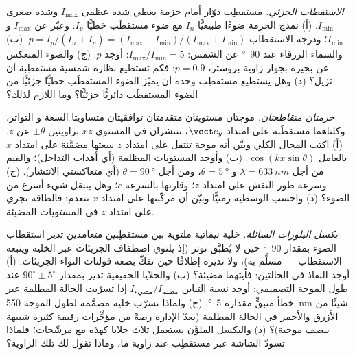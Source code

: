 \begin{exercise}[$\star\star$]\label{exo:b2:plane-waves-polarization:9}
\emph{الاستقطاب الجزئي.} مستقطِب دوّار أمام حزمة
يعطي شدة عظمى $I_{\max}$ وشدة صغرى $I_{\min}$. (أ) نمذج
الحزمة ضوءًا طبيعيًّا $I_n$ مع ضوء مستقطَب خطيًّا $I_p$: وعبّر عن
$I_{\max}$ و $I_{\min}$؛ ودرجة الاستقطاب $p = I_p/(I_n + I_p) =
(I_{\max} - I_{\min})/(I_{\max} + I_{\min})$. (ب) والسماء الزرقاء عند \qty{90}{\degree} عن
الشمس: $I_{\max}/I_{\min} = 5$: أوجد $p$. (ج) والضوء المنعكس عن بحيرة بجوار
زاوية بروستر، $p = 0.9$: فكم تستطيع نظارة شمسية مستقطِبة أن تزيل؟
(د) وهل يستطيع مستقطِب وحده أن يميّز الضوء المستقطَب خطيًّا جزئيًّا
من الضوء المستقطَب دائريًّا جزئيًّا؟ وما اللازم لذلك؟
\end{exercise}

\begin{exercise}[$\star\star\star$]\label{exo:b2:plane-waves-polarization:10}
\emph{حزمتان متقاطعتان.} موجتان مستويتان متقدمتان توافقيتان متساويتا السعة و
التواتر، وكلتاهما مستقطَبة على امتداد $\vect e_y$، تنتشران في المستوي $xz$
بزاويتين $\pm\theta$ عن $z$. (أ) اكتب المجال الكلي وبيّن أنه
موجة تنتقل على امتداد $z$ سعتها مضمَّنة على امتداد $x$ بالعامل
$\cos(kx\sin\theta)$. (ب) وأوجد  المستويات المظلمة (أي أهداب
التداخل)؛ والقيم من أجل $\lambda = \qty{633}{nm}$ و $\theta = \qty{5}{\degree}$، ومن أجل
$\theta = \qty{90}{\degree}$ (أي متعاكستي الانتشار). (ج) وسرعة طور
النقش على امتداد $z$؛ وقارنها بالسرعة $c$؛ وهل ينتقل شيء أسرع من
الضوء؟ (د) واحسب  الوسطية زمنيًّا وبيّن أن
مركّبتها على امتداد $x$ تنعدم: فالطاقة تجري على امتداد $z$ في المستويات
المضيئة.
\end{exercise}

\begin{exercise}[$\star\star\star$]\label{exo:b2:plane-waves-polarization:11}
\emph{بكسل البلورات السائلة.} خلية نيماتية ملتوية بين مستقطِبين
متعامدين تدير استقطاب الضوء بمقدار \qty{90}{\degree}
حين لا يُطبَّق توتر (إذ يلتوي اصطفاف الجزيئات عبر
الخلية ويتبعه الاستقطاب --- مسلَّم به)، ولا تديره إطلاقًا
حين تفكّ بضعة فولتات التواء الجزيئات. (أ) أوجد النفاذ في الحالتين: فأيتهما
مضيئة؟ (ب) والخلايا الحقيقية تدير بمقدار $90^\circ \pm 5^\circ$ عند طول الموجة
التصميمي: أوجد نسبة التباين $I_{\text{مضيء}}/I_{\text{مظلم}}$ إذا تسرّبت
الحالة المظلمة عبر خطأ متبقٍّ مقداره \qty{5}{\degree}. (ج) ولماذا تسرّب خلية
مصمَّمة لطول الموجة \qty{550}{nm} شيئًا من الأزرق والأحمر في الحالة المظلمة
(بعدّ الإدارة رصةً من مؤخِّرات رقيقة كثيرة شبيهة
بنصف موجية)؟ (د) والبكسل الملوَّن يستعمل ثلاث خلايا كهذه مع مرشّحات؛ فلماذا
تسودّ الشاشة عبر مستقطِب عند زاوية ما، وماذا
تقول لك تلك الزاوية؟
\end{exercise}

